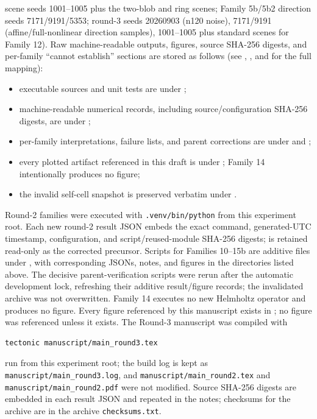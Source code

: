 \documentclass[12pt]{article}
\begin{document}
scene seeds 1001--1005 plus the two-blob and ring scenes; Family 5b/5b2
direction seeds 7171/9191/5353; round-3 seeds 20260903 (n120 noise), 7171/9191
(affine/full-nonlinear direction samples), 1001--1005 plus standard scenes for
Family 12). Raw machine-readable outputs, figures, source SHA-256
digests, and per-family ``cannot establish'' sections are stored as follows
(see , , and
 for the full mapping):
\begin{itemize}
\item executable sources and unit tests are under ;
\item machine-readable numerical records, including source/configuration
SHA-256 digests, are under ;
\item per-family interpretations, failure lists, and parent corrections are
under  and ;
\item every plotted artifact referenced in this draft is under
; Family 14 intentionally produces no figure;
\item the invalid self-cell snapshot is preserved verbatim under
.
\end{itemize}
Round-2 families were executed with \texttt{.venv/bin/python} from this
experiment root. Each new round-2 result JSON embeds the exact command,
generated-UTC timestamp, configuration, and script/reused-module SHA-256
digests;  is retained read-only
as the corrected precursor. Scripts for Families 10--15b are additive files
under , with corresponding JSONs, notes, and figures in the
directories listed above. The decisive parent-verification scripts were rerun after the
automatic development lock, refreshing their additive result/figure records;
the invalidated archive was not overwritten. Family 14
executes no new Helmholtz operator and produces no figure. Every figure
referenced by this manuscript exists in ; no figure was
referenced unless it exists.
The Round-3 manuscript was compiled with
\begin{verbatim}
tectonic manuscript/main_round3.tex
\end{verbatim}
run from this experiment root; the build log is kept as
\texttt{manuscript/main\_round3.log}, and \texttt{manuscript/main\_round2.tex}
and \texttt{manuscript/main\_round2.pdf} were not modified.
Source SHA-256 digests are embedded in each result JSON and repeated in the
notes; checksums for the archive are in the archive \texttt{checksums.txt}.
\end{document}

